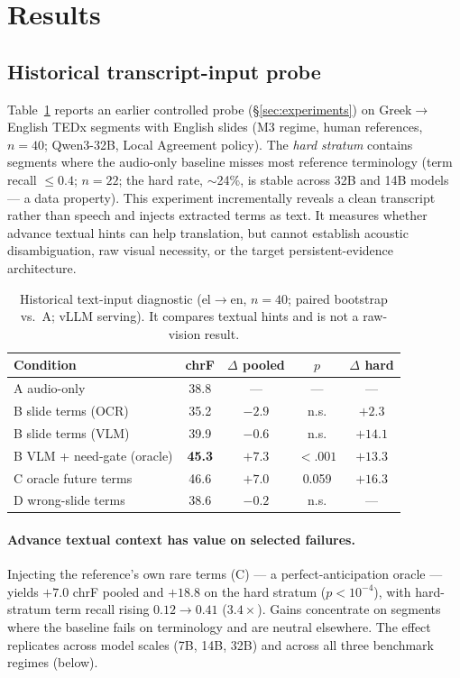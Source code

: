 \section{Results}
\label{sec:results}

\subsection{Historical transcript-input probe}
\label{sec:probe-results}

Table~\ref{tab:probe} reports an earlier controlled probe
(\S\ref{sec:experiments}) on
Greek$\rightarrow$English TEDx segments with English slides (M3 regime, human
references, $n{=}40$; Qwen3-32B, Local Agreement policy). The \emph{hard
stratum} contains segments where the audio-only baseline misses most reference
terminology (term recall $\leq 0.4$; $n{=}22$; the hard rate, $\sim$24\%, is
stable across 32B and 14B models --- a data property).
This experiment incrementally reveals a clean transcript rather than speech and
injects extracted terms as text. It measures whether advance textual hints can
help translation, but cannot establish acoustic disambiguation, raw visual
necessity, or the target persistent-evidence architecture.

\begin{table}[t]
\centering
\small
\begin{tabular}{lcccc}
\toprule
Condition & chrF & $\Delta$ pooled & $p$ & $\Delta$ hard \\
\midrule
A\; audio-only                & 38.8 & ---    & ---   & ---     \\
B\; slide terms (OCR)         & 35.2 & $-2.9$ & n.s.  & $+2.3$  \\
B\; slide terms (VLM)         & 39.9 & $-0.6$ & n.s.  & $+14.1$ \\
B\; VLM + need-gate (oracle)  & \textbf{45.3} & $\mathbf{+7.3}$ & $<.001$ & $+13.3$ \\
C\; oracle future terms       & 46.6 & $+7.0$ & 0.059 & $+16.3$ \\
D\; wrong-slide terms         & 38.6 & $-0.2$ & n.s.  & ---     \\
\bottomrule
\end{tabular}
\caption{Historical text-input diagnostic (el$\rightarrow$en, $n{=}40$;
paired bootstrap vs.\ A; vLLM serving). It compares textual hints and is not a
raw-vision result.}
\label{tab:probe}
\end{table}

\paragraph{Advance textual context has value on selected failures.}
Injecting the reference's own rare terms (C) --- a perfect-anticipation oracle
--- yields $+7.0$ chrF pooled and $+18.8$ on the hard stratum ($p{<}10^{-4}$),
with hard-stratum term recall rising $0.12\!\rightarrow\!0.41$ ($3.4\times$).
Gains concentrate on segments where the baseline fails on terminology and are
neutral elsewhere. The effect replicates across model scales (7B, 14B, 32B)
and across all three benchmark regimes (below).

